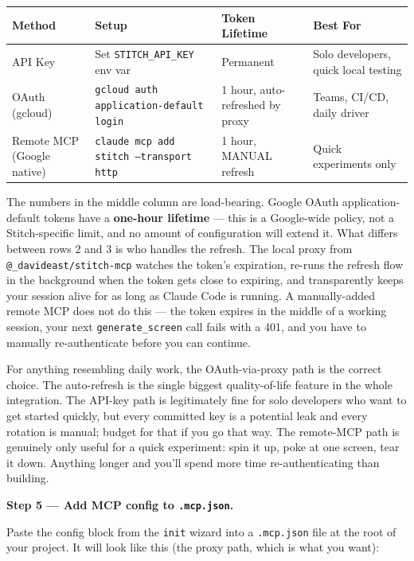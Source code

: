 \documentclass[11pt,letterpaper,openany]{book}
\begin{document}
\begin{gsdscenario}
\begin{center}
\begin{tabularx}{\linewidth}{@{}lXlX@{}}
\toprule
\textbf{Method} & \textbf{Setup} & \textbf{Token Lifetime} & \textbf{Best For} \\
\midrule
API Key & Set \texttt{STITCH\_API\_KEY} env var & Permanent & Solo developers, quick local testing \\
\addlinespace
OAuth (gcloud) & \texttt{gcloud auth application-default login} & 1 hour, auto-refreshed by proxy & Teams, CI/CD, daily driver \\
\addlinespace
Remote MCP (Google native) & \texttt{claude mcp add stitch --transport http} & 1 hour, MANUAL refresh & Quick experiments only \\
\bottomrule
\end{tabularx}
\end{center}

The numbers in the middle column are load-bearing. Google OAuth
application-default tokens have a \textbf{one-hour lifetime} --- this
is a Google-wide policy, not a Stitch-specific limit, and no amount of
configuration will extend it. What differs between rows 2 and 3 is who
handles the refresh. The local proxy from \texttt{@\_davideast/stitch-mcp}
watches the token's expiration, re-runs the refresh flow in the
background when the token gets close to expiring, and transparently
keeps your session alive for as long as Claude Code is running. A
manually-added remote MCP does not do this --- the token expires in
the middle of a working session, your next \texttt{generate\_screen}
call fails with a 401, and you have to manually re-authenticate before
you can continue.

For anything resembling daily work, the OAuth-via-proxy path is the
correct choice. The auto-refresh is the single biggest quality-of-life
feature in the whole integration. The API-key path is legitimately
fine for solo developers who want to get started quickly, but every
committed key is a potential leak and every rotation is manual; budget
for that if you go that way. The remote-MCP path is genuinely only
useful for a quick experiment: spin it up, poke at one screen, tear it
down. Anything longer and you'll spend more time re-authenticating
than building.

\vspace{6pt}
\textbf{Step 5 --- Add MCP config to \texttt{.mcp.json}.}
\vspace{4pt}

Paste the config block from the \texttt{init} wizard into a
\texttt{.mcp.json} file at the root of your project. It will look like
this (the proxy path, which is what you want):


\end{gsdscenario}
\end{document}
